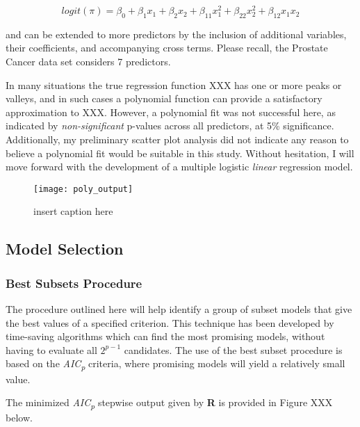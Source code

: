 \begin{equation}
logit(\pi) = \beta_0 + \beta_1x_1 + \beta_2x_2 + \beta_{11}x_1^2 + \beta_{22}x_2^2 + \beta_{12}x_1x_2
\end{equation}

\noindent and can be extended to more predictors by the inclusion of additional variables, their coefficients, and accompanying cross terms. Please recall, the Prostate Cancer data set considers 7 predictors.


In many situations the true regression function XXX has one or more peaks or valleys, and in such cases a polynomial function can provide a satisfactory approximation to XXX. However, a polynomial fit was not successful here, as indicated by \textit{non-significant} p-values across all predictors, at 5\% significance. Additionally, my preliminary scatter plot analysis did not indicate any reason to believe a polynomial fit would be suitable in this study. Without hesitation, I will move forward with the development of a multiple logistic \textit{linear} regression model.

\begin{figure}[H]
	\centering
	\texttt{[image: poly\_output]}
	\caption{insert caption here}
\end{figure}





\subsection{Model Selection}

\subsubsection{Best Subsets Procedure}
The procedure outlined here will help identify a group of subset models that give the best values of a specified criterion. This technique has been developed by time-saving algorithms which can find the most promising models, without having to evaluate all \(2^{p-1}\) candidates. The use of the best subset procedure is based on the \textit{AIC\textsubscript{p}} criteria, where promising models will yield a relatively small value. \par

The minimized \textit{AIC\textsubscript{p}} stepwise output given by \textbf{R} is provided in Figure XXX below.

